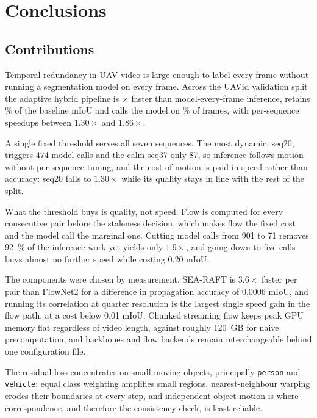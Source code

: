 \documentclass[report.tex]{subfiles}
\begin{document}
\chapter{Conclusions}
\label{ch:conclusion}

\section{Contributions}
\label{sec:conclusions}

Temporal redundancy in UAV video is large enough to label every frame without
running a segmentation model on every frame. Across the UAVid validation split
the adaptive hybrid pipeline is \Speedup$\times$ faster than model-every-frame
inference, retains \Retention\% of the baseline mIoU and calls the model on
\PctModel\% of frames, with per-sequence speedups between $1.30\times$ and
$1.86\times$.

A single fixed threshold serves all seven sequences. The most dynamic, seq20,
triggers 474 model calls and the calm seq37 only 87, so inference follows
motion without per-sequence tuning, and the cost of motion is paid in speed
rather than accuracy: seq20 falls to $1.30\times$ while its quality stays in
line with the rest of the split.

What the threshold buys is quality, not speed. Flow is computed for every
consecutive pair before the staleness decision, which makes flow the fixed
cost and the model call the marginal one. Cutting model calls from 901 to 71
removes \SI{92}{\percent} of the inference work yet yields only $1.9\times$,
and going down to five calls buys almost no further speed while costing
\num{0.20} mIoU.

The components were chosen by measurement. SEA-RAFT is $3.6\times$ faster per
pair than FlowNet2 for a difference in propagation accuracy of \num{0.0006}
mIoU, and running its correlation at quarter resolution is the largest single
speed gain in the flow path, at a cost below \num{0.01} mIoU. Chunked
streaming flow keeps peak GPU memory flat regardless of video length, against
roughly \SI{120}{GB} for naive precomputation, and backbones and flow backends
remain interchangeable behind one configuration file.

The residual loss concentrates on small moving objects, principally
\texttt{person} and \texttt{vehicle}: equal class weighting amplifies small
regions, nearest-neighbour warping erodes their boundaries at every step, and
independent object motion is where correspondence, and therefore the
consistency check, is least reliable.
\end{document}
